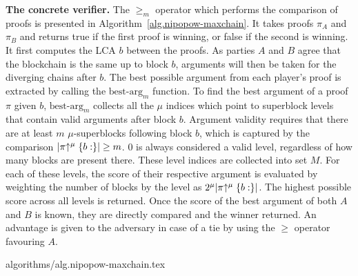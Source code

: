 \noindent
\textbf{The concrete verifier.}
The $\geq_m$ operator which performs the
comparison of proofs is presented in Algorithm~\ref{alg.nipopow-maxchain}. It
takes proofs $\pi_A$ and $\pi_B$ and returns true if the first proof is winning,
or false if the second is winning. It first computes the LCA $b$ between the
proofs. As parties $A$ and $B$ agree that the blockchain is the same up to block
$b$, arguments will then be taken for the diverging chains after $b$. The best
possible argument from each player's proof is extracted by calling the
$\text{best-arg}_m$ function.
To find the best argument of a proof $\pi$ given $b$, $\text{best-arg}_m$
collects all the $\mu$ indices which point to superblock levels that contain
valid arguments after block $b$. Argument validity requires that there are at
least $m$ $\mu$-superblocks following block $b$, which is captured by the
comparison $|\pi\negthickspace\uparrow^\mu\{b:\}| \geq m$. $0$ is always considered a valid
level, regardless of how many blocks are present there. These level indices are
collected into set $M$. For each of these levels, the score of their respective
argument is evaluated by weighting the number of blocks by the level as
$2^\mu|\pi\negthickspace\uparrow^\mu\{b:\}|$. The highest possible score across all levels is
returned. Once the score of the best argument of both $A$ and $B$ is known, they
are directly compared and the winner returned.  An advantage is given to the
adversary in case of a tie by using the $\geq$ operator favouring $A$.

{algorithms/alg.nipopow-maxchain.tex}
